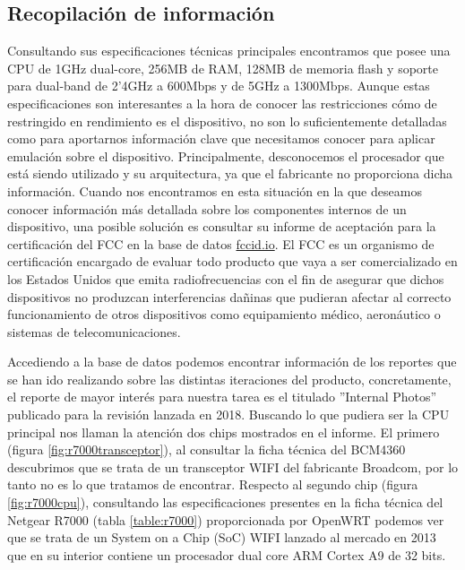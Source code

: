 \subsection{Recopilación de información}
Consultando sus especificaciones técnicas principales 
encontramos que posee una CPU de 1GHz dual-core, 256MB de RAM, 128MB de memoria flash y soporte para dual-band de 2'4GHz a 600Mbps y de 5GHz a 
1300Mbps. Aunque estas especificaciones son interesantes a la hora de conocer las restricciones cómo de restringido en rendimiento es el dispositivo,
no son lo suficientemente detalladas como para aportarnos información clave que necesitamos conocer para aplicar emulación sobre el dispositivo.
Principalmente, desconocemos el procesador que está siendo utilizado y su arquitectura, ya que el fabricante no proporciona dicha información.
Cuando nos encontramos en esta situación en la que deseamos conocer información más detallada sobre los componentes internos de un dispositivo, 
una posible solución es consultar su informe de aceptación para la certificación del FCC\cite{fcc} en la base de datos \hyperlink{fccid.io}{fccid.io}.
El FCC es un organismo de certificación encargado de evaluar todo producto que vaya a ser comercializado en los Estados Unidos que emita 
radiofrecuencias con el fin de asegurar que dichos dispositivos no produzcan interferencias dañinas que pudieran afectar al correcto
funcionamiento de otros dispositivos como equipamiento médico, aeronáutico o sistemas de telecomunicaciones.\bigskip

Accediendo a la base de datos podemos encontrar información de los reportes que se han ido realizando sobre las distintas iteraciones del producto,
concretamente, el reporte de mayor interés para nuestra tarea es el titulado ''Internal Photos'' publicado para la revisión lanzada en 2018\cite{netgearFCCid}.
Buscando lo que pudiera ser la CPU principal nos llaman la atención dos chips mostrados en el informe. El primero (figura \ref{fig:r7000transceptor}), al 
consultar la ficha técnica del BCM4360 descubrimos que se trata de un transceptor WIFI del fabricante Broadcom, por lo tanto no es lo que tratamos de 
encontrar. Respecto al segundo chip (figura \ref{fig:r7000cpu}), consultando las especificaciones presentes en la ficha técnica del Netgear R7000 
(tabla \ref{table:r7000}) proporcionada por OpenWRT podemos ver que se trata de un System on a Chip (SoC) WIFI lanzado al mercado en 2013\cite{broadcomSOCs} 
que en su interior contiene un procesador dual core ARM Cortex A9 de 32 bits.


